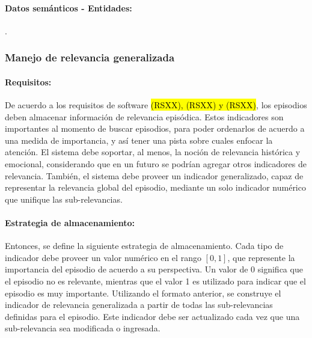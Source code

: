 

\paragraph{Datos semánticos - Entidades:}
.





\subsubsection{Manejo de relevancia generalizada}

\paragraph{Requisitos:}
De acuerdo a los requisitos de software \hl{(RSXX), (RSXX) y (RSXX)}, los episodios deben almacenar información de relevancia episódica. Estos indicadores son importantes al momento de buscar episodios, para poder ordenarlos de acuerdo a una medida de importancia, y así tener una pista sobre cuales enfocar la atención. El sistema debe soportar, al menos, la noción de relevancia histórica y emocional, considerando que en un futuro se podrían agregar otros indicadores de relevancia. También, el sistema debe proveer un indicador generalizado, capaz de representar la relevancia global del episodio, mediante un solo indicador numérico que unifique las sub-relevancias.


\paragraph{Estrategia de almacenamiento:}
Entonces, se define la siguiente estrategia de almacenamiento. Cada tipo de indicador debe proveer un valor numérico en el rango $[0, 1]$, que represente la importancia del episodio de acuerdo a su perspectiva. Un valor de 0 significa que el episodio no es relevante, mientras que el valor 1 es utilizado para indicar que el episodio es muy importante. Utilizando el formato anterior, se construye el indicador de relevancia generalizada a partir de todas las sub-relevancias definidas para el episodio. Este indicador debe ser actualizado cada vez que una sub-relevancia sea modificada o ingresada.



